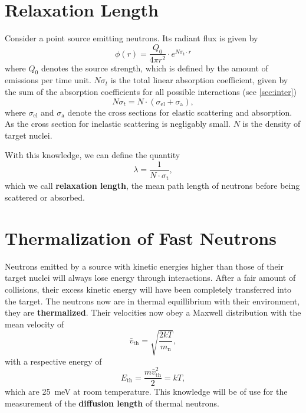 \section{Relaxation Length}
Consider a point source emitting neutrons.
Its radiant flux is given by
\begin{equation}\label{eq:relax}
	\phi(r) = \frac{Q_0}{4\pi r^2}\cdot e^{N\sigma_\text{t}\cdot r}
\end{equation}
where $Q_0$ denotes the source strength, which is defined by the amount of emissions per time unit.
$N\sigma_t$ is the total linear absorption coefficient, given by the sum of the absorption coefficients for all possible interactions (see \autoref{sec:inter})
\begin{equation*}
	N\sigma_t = N\cdot(\sigma_\text{el} + \sigma_\text{a}),
\end{equation*}
where $\sigma_\text{el}$ and $\sigma_\text{a}$ denote the cross sections for elastic scattering and absorption.
As the cross section for inelastic scattering is negligably small.
$N$ is the density of target nuclei.

With this knowledge, we can define the quantity
\begin{equation*}
	\lambda = \frac{1}{N\cdot\sigma_\text{t}},
\end{equation*}
which we call \textbf{relaxation length}, the mean path length of neutrons before being scattered or absorbed.

\section{Thermalization of Fast Neutrons}
Neutrons emitted by a source with kinetic energies higher than those of their target nuclei will always lose energy through interactions.
After a fair amount of collisions, their excess kinetic energy will have been completely transferred into the target.
The neutrons now are in thermal equillibrium with their environment, they are \textbf{thermalized}.
Their velocities now obey a Maxwell distribution with the mean velocity of
\begin{equation*}
	\bar{v}_\text{th}=\sqrt{\frac{2kT}{m_\text{n}}},
\end{equation*}
with a respective energy of
\begin{equation*}
	E_\text{th}=\frac{m\bar{v}_\text{th}^2}{2} = kT,
\end{equation*}
which are \SI{25}{\meV} at room temperature.
This knowledge will be of use for the measurement of the \textbf{diffusion length} of thermal neutrons.

